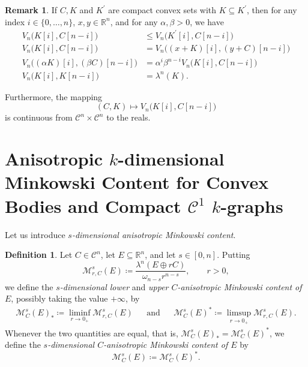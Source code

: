 \documentclass[pdflatex,sn-mathphys-num]{sn-jnl}
\theoremstyle{plain}
\theoremstyle{definition}
\newtheorem{definition}[theorem]{Definition}
\newtheorem{rem}[theorem]{Remark}
\begin{document}
\begin{rem}
    If $C, K$ and $K^{\prime}$ are compact convex sets with $K\subseteq K^{\prime}$, then for any index $i\in\{0, \dots, n\}$, $x, y\in\mathbb{R}^n$, and for any $\alpha, \beta>0$, we have \begin{equation}\label{pp5}
    \begin{split}
        V_n\bigl(K[i],C[n-i]\bigr)&\leq V_n\bigl(K^{\prime}[i], C[n-i]\bigr)\\V_n\bigl(K[i],C[n-i]\bigr)&= V_n\bigl((x+K)[i], (y+C)[n-i]\bigr)\\ V_n\bigl((\alpha K)[i], (\beta C)[n-i]\bigr)&=\alpha^i \beta^{n-i}V_n\bigl(K[i], C[n-i]\bigr) \\ V_n\bigl(K[i], K[n-i]\bigr)&=\lambda^n(K).\end{split}\end{equation}
        
        Furthermore, the mapping $$(C, K)\mapsto V_n\bigl(K[i],C[n-i]\bigr)$$ is continuous from $\mathcal{C}^n\times\mathcal{C}^n$ to the reals.
\end{rem}

    


\section{Anisotropic $k$-dimensional Minkowski Content for Convex Bodies and Compact $\mathcal{C}^1$ $k$-graphs}\label{secDef}

    
Let us introduce \textit{$s$-dimensional anisotropic Minkowski content}.

\begin{definition}\label{def1} Let $C\in\mathcal{C}^n$, let  $E\subseteq\mathbb{R}^n$, and let $s\in [0, n]$. Putting $$\mathcal{M}^{s}_{r, C}(E)\coloneq \frac{\lambda^{n}(E\oplus rC)}{\omega_{n-s}r^{n-s}},\qquad r>0,$$ we define the \textit{$s$-dimensional lower} and \textit{upper $C$-anisotropic Minkowski content of $E$}, possibly taking the value $+\infty$, by \begin{align*}
    \mathcal{M}^s_{C}(E)_*\coloneq \liminf_{r\to0_+}\mathcal{M}^{s}_{r, C}(E)&& \text{and}&&\mathcal{M}^s_{C}(E)^*\coloneq \limsup_{r\to0_+}\mathcal{M}^{s}_{r, C}(E).
\end{align*} Whenever the two quantities are equal, that is, $\mathcal{M}^s_{C}(E)_*=\mathcal{M}^s_{C}(E)^*$, we define the \textit{$s$-dimensional $C$-anisotropic Minkowski content of $E$} by $$\mathcal{M}^s_{C}(E)\coloneq \mathcal{M}^s_{C}(E)^*.$$
\end{definition}
\end{document}
